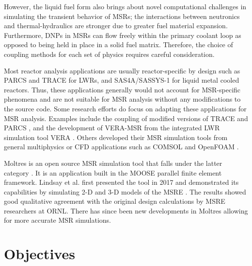 However, the liquid fuel form also brings about novel computational
challenges in simulating the transient behavior of \glspl{MSR}; the
interactions between neutronics and thermal-hydraulics are stronger due
to greater fuel material expansion. Furthermore, \glspl{DNP} in \glspl{MSR}
can flow freely within the primary coolant
loop as opposed to being held in place in a solid fuel matrix. Therefore,
the choice of coupling methods for each set of physics requires careful
consideration. 

Most reactor analysis applications are usually reactor-specific by
design such as PARCS and TRACE for \glspl{LWR}, and SAS4A/SASSYS-1 for
liquid metal cooled reactors. Thus, these applications generally would not
account for \gls{MSR}-specific phenomena and are not suitable for \gls{MSR}
analysis without any modifications to the source code. Some research efforts
do focus on adapting these applications for \gls{MSR} analysis. Examples
include the coupling of modified versions of TRACE and PARCS
\cite{pettersen_coupled_2016}, and the development of VERA-MSR from the
integrated \gls{LWR} simulation tool VERA \cite{graham_development_2019}.
Others developed their \gls{MSR} simulation tools from general
multiphysics or \gls{CFD} applications such as COMSOL
\cite{fiorina_modelling_2014} and OpenFOAM \cite{aufiero_development_2014}.

Moltres is an open source MSR simulation tool that falls under the latter
category \cite{lindsay_introduction_2018}. It is an application built in the
\gls{MOOSE} \cite{gaston_physics-based_2015} parallel finite element
framework. Lindsay et al. first presented the tool in 2017 and demonstrated
its capabilities by simulating 2-D and 3-D models of the \gls{MSRE}
\cite{lindsay_introduction_2018}. The results showed good qualitative
agreement with the original design calculations by \gls{MSRE} researchers at
\gls{ORNL}. There has since been new developments in Moltres allowing for
more accurate \gls{MSR} simulations.

\section{Objectives}

